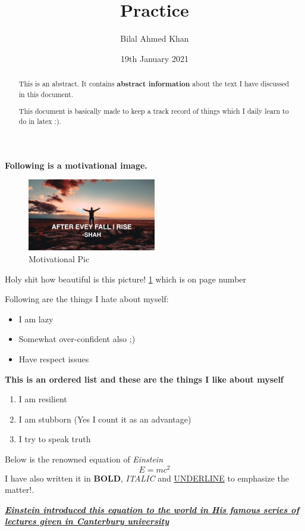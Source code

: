 \documentclass[12pt]{article}
\title{Practice}
\author{Bilal Ahmed Khan}
\date{19th January 2021}
\begin{document}
\maketitle
\begin{abstract}
    This is an abstract. It contains \textbf{abstract information} about the text I have discussed in this document. 
    
    This document is basically made to keep a track record of things which I daily learn to do in latex :).
\end{abstract}
\textbf{Following is a motivational image.}
\begin{figure}[h]
    \centering
    \includegraphics[width=0.5\textwidth]{Desktop Background.png}
    \caption{Motivational Pic}
    \label{fig: motivational}
\end{figure}

Holy shit how beautiful is this picture! \ref{fig: motivational}
which is on page number \pageref{fig: motivational}

Following are the things I hate about myself:
\begin{itemize}
\item I am lazy
\item Somewhat over-confident also ;)
\item Have respect issues
\end{itemize}
\newpage
\noindent\textbf{This is an ordered list and these are the things I like about myself}
\begin{enumerate}
\item I am resilient
\item I am stubborn (Yes I count it as an advantage)
\item I try to speak truth
\end{enumerate}

Below is the renowned equation of \textit{Einstein}\[E=mc^2\]
I have also written it in \textbf{\large BOLD}, \textit{\large ITALIC} and \underline{\large UNDERLINE} to emphasize the matter!.

\textit{\textbf{\uline{Einstein introduced this equation to the world in His famous series of lectures given in Canterbury university}}}
\end{document}
